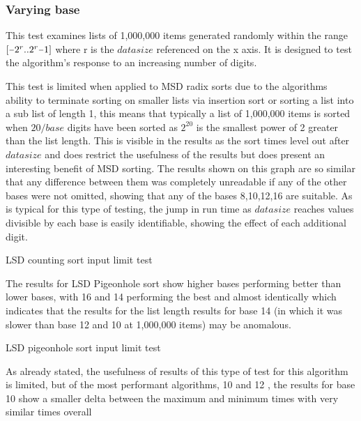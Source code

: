 \documentclass[12pt]{article}
\newcommand{\minus}{\scalebox{0.75}[1.0]{$-$}}
\begin{document}
	\subsubsection{Varying base}
	\label{sssec:varyingbase}
	This test examines lists of 1,000,000 items generated randomly within the range $[\minus2^r..2^r\minus1]$ where r is the $data$\textunderscore $size$ referenced on the x axis. It is designed to test the algorithm's response to an increasing number of digits.
	\par
	This test is limited when applied to MSD radix sorts due to the algorithms ability to terminate sorting on smaller lists via insertion sort or sorting a list into a sub list of length 1, this means that typically a list of 1,000,000 items is sorted when $20/{base}$ digits have been sorted as $2^{20}$ is the smallest power of 2 greater than the list length. This is visible in the results as the sort times level out after $data$\textunderscore $size$ and does restrict the usefulness of the results but does present an interesting benefit of MSD sorting.
	The results shown on this graph are so similar that any difference between them was completely unreadable if any of the other bases were not omitted, showing that any of the bases 8,10,12,16 are suitable. As is typical for this type of testing, the jump in run time as $data$\textunderscore $size$ reaches values divisible by each base is easily identifiable, showing the effect of each additional digit.
	\begin{table}[h]
		\centering
			\caption{LSD counting sort input limit test}
	\end{table}
	\vspace{-1cm}
	The results for LSD Pigeonhole sort show higher bases performing better than lower bases, with 16 and 14 performing the best and almost identically which indicates that the results for the list length results for base 14 (in which it was slower than base 12 and 10 at 1,000,000 items) may be anomalous.
	\begin{table}[h]
		\centering
			\caption{LSD pigeonhole sort input limit test}
	\end{table}
	As already stated, the usefulness of results of this type of test for this algorithm is limited, but of the most performant algorithms, 10 and 12 , the results for base 10 show a smaller delta between the maximum and minimum times with very similar times overall
\end{document}
